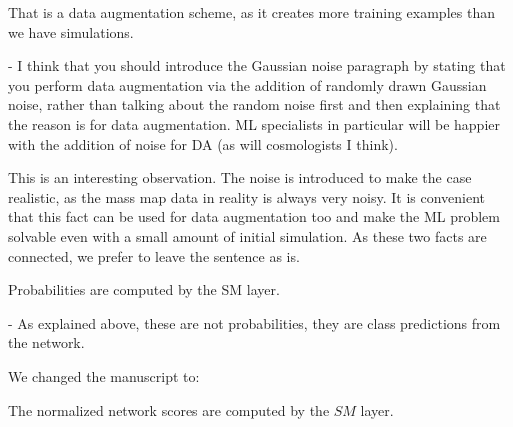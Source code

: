 \documentclass[12pt,a4paper]{article}
\newcommand{\nati}[1]{{\color[rgb]{.1,.6,.1}{NP: #1}}}
\newcommand{\TK}[1]{{\color{red}{TK: #1}}}
\newcommand{\todo}[1]{{\color[rgb]{.6,.1,.6}{TODO: #1}}}
\newcommand{\1}{\b{1}}              %
\newcommand{\0}{\b{0}}              %
\begin{document}
\begin{mdframed}[style=comment]
That is a data augmentation scheme, as it creates more training examples than we have simulations.

- I think that you should introduce the Gaussian noise paragraph by stating that you perform data augmentation via the addition of randomly drawn Gaussian noise, rather than talking about the random noise first and then explaining that the reason is for data augmentation. ML specialists in particular will be happier with the addition of noise for DA (as will cosmologists I think).
\end{mdframed}
\todo{To check: @all}


This is an interesting observation. The noise is introduced to make the case realistic, as the mass map data in reality is always very noisy. It is convenient that this fact can be used for data augmentation too and make the ML problem solvable even with a small amount of initial simulation. As these two facts are connected, we prefer to leave the sentence as is.

\begin{mdframed}[style=comment]
Probabilities are computed by the SM layer.

- As explained above, these are not probabilities, they are class predictions from the network.
\end{mdframed}
\todo{To check: @michael}

We changed the manuscript to:
\begin{mdframed}[style=manuscript]
The normalized network scores are computed by the $SM$ layer.
\end{mdframed}
\end{document}
